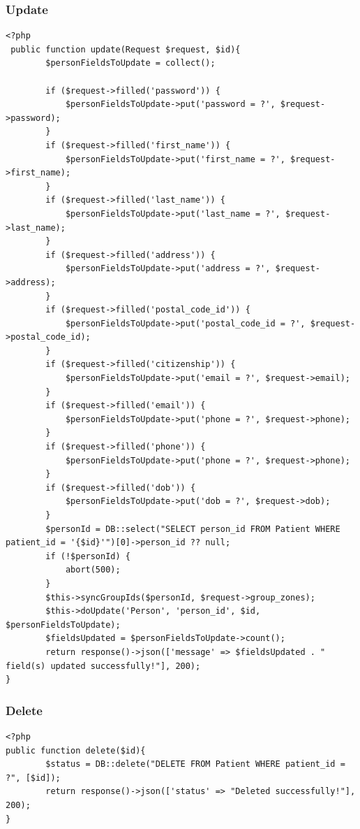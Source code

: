 \subsubsection{Update}
\begin{verbatim}
<?php
 public function update(Request $request, $id){
        $personFieldsToUpdate = collect();

        if ($request->filled('password')) {
            $personFieldsToUpdate->put('password = ?', $request->password);
        }
        if ($request->filled('first_name')) {
            $personFieldsToUpdate->put('first_name = ?', $request->first_name);
        }
        if ($request->filled('last_name')) {
            $personFieldsToUpdate->put('last_name = ?', $request->last_name);
        }
        if ($request->filled('address')) {
            $personFieldsToUpdate->put('address = ?', $request->address);
        }
        if ($request->filled('postal_code_id')) {
            $personFieldsToUpdate->put('postal_code_id = ?', $request->postal_code_id);
        }
        if ($request->filled('citizenship')) {
            $personFieldsToUpdate->put('email = ?', $request->email);
        }
        if ($request->filled('email')) {
            $personFieldsToUpdate->put('phone = ?', $request->phone);
        }
        if ($request->filled('phone')) {
            $personFieldsToUpdate->put('phone = ?', $request->phone);
        }
        if ($request->filled('dob')) {
            $personFieldsToUpdate->put('dob = ?', $request->dob);
        }
        $personId = DB::select("SELECT person_id FROM Patient WHERE patient_id = '{$id}'")[0]->person_id ?? null;
        if (!$personId) {
            abort(500);
        }
        $this->syncGroupIds($personId, $request->group_zones);
        $this->doUpdate('Person', 'person_id', $id, $personFieldsToUpdate);
        $fieldsUpdated = $personFieldsToUpdate->count();
        return response()->json(['message' => $fieldsUpdated . " field(s) updated successfully!"], 200);
}

\end{verbatim}
\subsubsection{Delete}
\begin{verbatim}
<?php
public function delete($id){
        $status = DB::delete("DELETE FROM Patient WHERE patient_id = ?", [$id]);
        return response()->json(['status' => "Deleted successfully!"], 200);
}

\end{verbatim}

